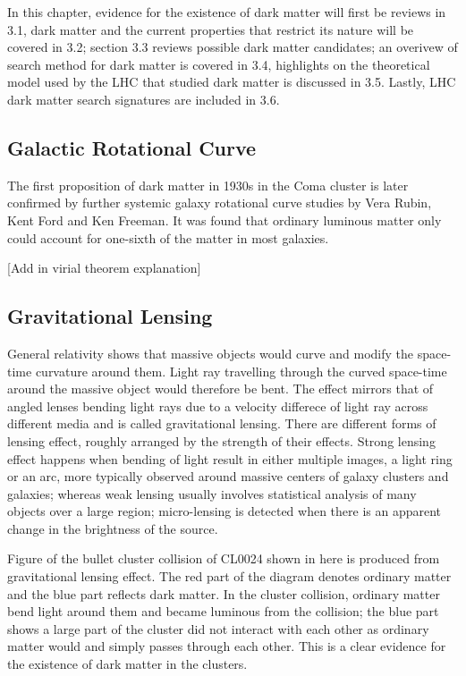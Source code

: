    In this chapter, evidence for the existence of dark matter will first be reviews in 3.1, dark matter and the current properties that restrict its nature will be covered in 3.2; section 3.3 reviews possible dark matter candidates; an overivew of search method for dark matter is covered in 3.4,  highlights on the theoretical model used by the LHC that studied dark matter is discussed in 3.5. Lastly, LHC dark matter search signatures are included in 3.6.


\subsection{Galactic Rotational Curve}
The first proposition of dark matter in 1930s in the Coma cluster is later confirmed by further systemic galaxy rotational curve studies by Vera Rubin, Kent Ford and Ken Freeman. It was found that ordinary luminous matter only could account for one-sixth of the matter in most galaxies. 

[Add in virial theorem explanation]

\subsection{Gravitational Lensing}

General relativity shows that massive objects would curve and modify the space-time curvature around them. Light ray travelling through the curved space-time around the massive object would therefore be bent. The effect mirrors that of angled lenses bending light rays due to a velocity differece of light ray across different media and is called gravitational lensing. There are different forms of lensing effect, roughly arranged by the strength of their effects. Strong lensing
effect happens when bending of light result in either multiple images, a light ring or an arc, more typically observed around massive centers of galaxy clusters and galaxies; whereas weak lensing usually involves statistical analysis of many objects over a large region; micro-lensing is detected when there is an apparent change in the brightness of the source.


Figure of the bullet cluster collision of CL0024 shown in here is produced from gravitational lensing effect. The red part of the diagram denotes ordinary matter and the blue part reflects dark matter. In the cluster collision, ordinary matter bend light around them and became luminous from the collision; the blue part shows a large part of the cluster did not interact with each other as ordinary matter would and simply passes through each other. This is a clear evidence for the existence of dark matter in the clusters.

